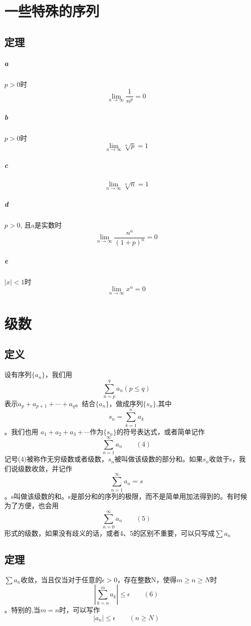 \chapter*{一些特殊的序列}
\section{定理}
\paragraph{a} $p > 0$时$$\lim_{n \to \infty}\frac{1}{n^p} = 0$$
\paragraph{b} $p > 0$时$$\lim_{n \to \infty}\sqrt[n]{p} = 1$$
\paragraph{c} $$\lim_{n \to \infty}\sqrt[n]{n} = 1$$
\paragraph{d} $p > 0$, 且a是实数时$$\lim_{n \to \infty}\frac{n^a}{(1 + p)^n} = 0$$
\paragraph{e} $|x| < 1$时$$\lim_{n \to \infty} x^n = 0 $$
\chapter*{级数}
\section{定义}设有序列$\{a_n\}$，我们用$$\sum_{n=p}^{q}{a_n} (p \le q)$$表示$a_p + a_{p+1} + \cdots + a_q $。结合$\{a_n\}$，做成序列$\{s_n\}$,其中$$s_n = \sum_{k=1}^{n}{a_k} $$。我们也用 $a_1 + a_2 + a_3 + \cdots $作为$\{s_n\}$的符号表达式，或者简单记作$$\sum_{n=1}^{\infty}{a_n} \qquad (4)$$记号(4)被称作无穷级数或者级数，$s_n$被叫做该级数的部分和。如果$s_n$收敛于s，我们说级数收敛，并记作$$\sum_{n=1}^{\infty}{a_n} = s $$。s叫做该级数的和。s是部分和的序列的极限，而不是简单用加法得到的。有时候为了方便，也会用$$\sum_{n=0}^{\infty}{a_n} \qquad (5)$$形式的级数，如果没有歧义的话，或者4、5的区别不重要，可以只写成$\sum{a_n}$
\section{定理} $\sum{a_n}$收敛，当且仅当对于任意的$\epsilon > 0$，存在整数N，使得$m \ge n \ge N$时$$ \left| \sum_{k=n}^{m}{a_k} \right| \le \epsilon \qquad (6)$$。特别的,当$m=n$时，可以写作$$|a_n | \le \epsilon \qquad (n \ge N)$$
